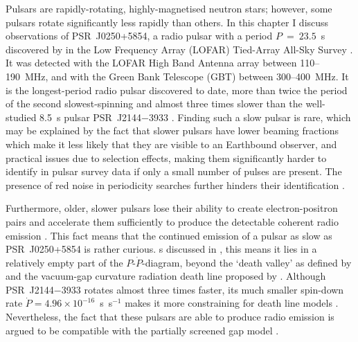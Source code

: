 Pulsars are rapidly-rotating, highly-magnetised neutron stars; however, some pulsars rotate significantly less rapidly than others. In this chapter I discuss observations of PSR~J0250+5854, a radio pulsar with a period $P~=~23.5$~s discovered by \citet{TBC+2018} in the Low Frequency Array (LOFAR) Tied-Array All-Sky Survey \citep[LOTAAS;][]{SCB+2019}. It was detected with the LOFAR High Band Antenna array between 110--190~MHz, and with the Green Bank Telescope (GBT) between 300--400~MHz. It is the longest-period radio pulsar discovered to date, more than twice the period of the second slowest-spinning \citep[PSR~J2251$-$3711 at $P = 12.1$~s;][]{MKE+2020} and almost three times slower than the well-studied 8.5~s pulsar PSR~J2144$-$3933 \citep{YMJx1999}. %
Finding such a slow pulsar is rare, which may be explained by the fact that slower pulsars have lower beaming fractions which make it less likely that they are visible to an Earthbound observer, and practical issues due to selection effects, making them significantly harder to identify in pulsar survey data if only a small number of pulses are present. The presence of red noise in periodicity searches further hinders their identification \citep[e.g.][]{LBH+2015,HKRx2017}.


Furthermore, older, slower pulsars lose their ability to create electron-positron pairs and accelerate them sufficiently to produce the detectable coherent radio emission \citep{Sxxx1971}. This fact means that the continued emission of a pulsar as slow as PSR~J0250+5854 is rather curious. s discussed in \citet{TBC+2018}, this means it lies in a relatively empty part of the $P$-$\dot{P}$-diagram, beyond the `death valley' as defined by \citet{CRxx1993} and the vacuum-gap curvature radiation death line proposed by \citet{ZHMx2000}. Although PSR~J2144$-$3933 rotates almost three times faster, its much smaller spin-down rate $\dot{P} = 4.96\times10^{-16}$~s~s$^{-1}$ makes it more constraining for death line models \citep{MBMA2020}. Nevertheless, the fact that these pulsars are able to produce radio emission is argued to be compatible with the partially screened gap model \citep[e.g.][]{Sxxx2013}.


